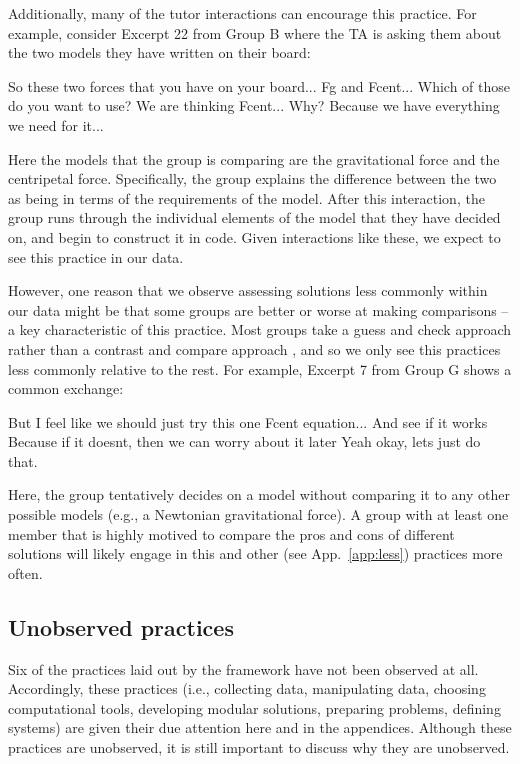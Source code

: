 \documentclass{msuphddissertation}
\begin{document}
\begin{doublespace}
Additionally, many of the tutor interactions can encourage this practice.  For example, consider Excerpt 22 from Group B where the TA is asking them about the two models they have written on their board:\begin{description}
\TA So these two forces that you have on your board...
\TA Fg and Fcent...
\TA Which of those do you want to use?
\SB We are thinking Fcent...
\TA Why?
\SB Because we have everything we need for it...
\end{description}  Here the models that the group is comparing are the gravitational force and the centripetal force.  Specifically, the group explains the difference between the two as being in terms of the requirements of the model.  After this interaction, the group runs through the individual elements of the model that they have decided on, and begin to construct it in code.  Given interactions like these, we expect to see this practice in our data.

However, one reason that we observe assessing solutions less commonly within our data might be that some groups are better or worse at making comparisons -- a key characteristic of this practice.  Most groups take a guess and check approach rather than a contrast and compare approach \cite{Hammann2003}, and so we only see this practices less commonly relative to the rest.  For example, Excerpt 7 from Group G shows a common exchange: \begin{description}
\SC But I feel like we should just try this one {Fcent equation}...
\SC And see if it works
\SC Because if it doesnt, then we can worry about it {later}
\SB Yeah okay, lets just do that.
\end{description}  Here, the group tentatively decides on a model without comparing it to any other possible models (e.g., a Newtonian gravitational force).  A group with at least one member that is highly motived to compare the pros and cons of different solutions will likely engage in this and other (see App.~\ref{app:less}) practices more often.

\subsection{Unobserved practices}\label{CH6:Unobserved}

Six of the practices laid out by the framework have not been observed at all.  Accordingly, these practices (i.e., collecting data, manipulating data, choosing computational tools, developing modular solutions, preparing problems, defining systems) are given their due attention here and in the appendices.  Although these practices are unobserved, it is still important to discuss why they are unobserved.


\end{doublespace}
\end{document}
